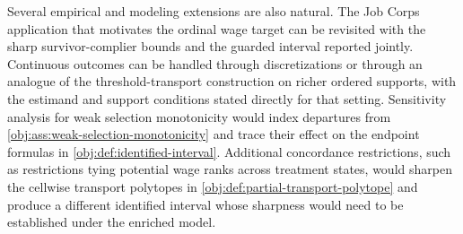 Several empirical and modeling extensions are also natural.  The Job Corps application that motivates the ordinal wage target can be revisited with the sharp survivor-complier bounds and the guarded interval reported jointly.  Continuous outcomes can be handled through discretizations or through an analogue of the threshold-transport construction on richer ordered supports, with the estimand and support conditions stated directly for that setting.  Sensitivity analysis for weak selection monotonicity would index departures from \cref{obj:ass:weak-selection-monotonicity} and trace their effect on the endpoint formulas in \cref{obj:def:identified-interval}.  Additional concordance restrictions, such as restrictions tying potential wage ranks across treatment states, would sharpen the cellwise transport polytopes in \cref{obj:def:partial-transport-polytope} and produce a different identified interval whose sharpness would need to be established under the enriched model.

